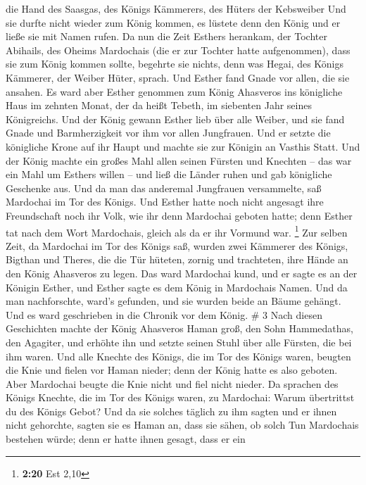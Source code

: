 die Hand des Saasgas, des Königs Kämmerers, des Hüters der Kebsweiber
Und sie durfte nicht wieder zum König kommen, es lüstete denn den König
und er ließe sie mit Namen rufen.  Da nun die Zeit Esthers
herankam, der Tochter Abihails, des Oheims Mardochais (die er zur
Tochter hatte aufgenommen), dass sie zum König kommen sollte, begehrte
sie nichts, denn was Hegai, des Königs Kämmerer, der Weiber Hüter,
sprach. Und Esther fand Gnade vor allen, die sie ansahen. 
Es ward aber Esther genommen zum König Ahasveros ins königliche Haus im
zehnten Monat, der da heißt Tebeth, im siebenten Jahr seines
Königreichs.  Und der König gewann Esther lieb über alle
Weiber, und sie fand Gnade und Barmherzigkeit vor ihm vor allen
Jungfrauen. Und er setzte die königliche Krone auf ihr Haupt und machte
sie zur Königin an Vasthis Statt.  Und der König machte ein
großes Mahl allen seinen Fürsten und Knechten -- das war ein Mahl um
Esthers willen -- und ließ die Länder ruhen und gab königliche Geschenke
aus.  Und da man das anderemal Jungfrauen versammelte, saß
Mardochai im Tor des Königs.  Und Esther hatte noch nicht
angesagt ihre Freundschaft noch ihr Volk, wie ihr denn Mardochai geboten
hatte; denn Esther tat nach dem Wort Mardochais, gleich als da er ihr
Vormund war. \footnote{\textbf{2:20} Est 2,10}  Zur selben
Zeit, da Mardochai im Tor des Königs saß, wurden zwei Kämmerer des
Königs, Bigthan und Theres, die die Tür hüteten, zornig und trachteten,
ihre Hände an den König Ahasveros zu legen.  Das ward
Mardochai kund, und er sagte es an der Königin Esther, und Esther sagte
es dem König in Mardochais Namen.  Und da man nachforschte,
ward's gefunden, und sie wurden beide an Bäume gehängt. Und es ward
geschrieben in die Chronik vor dem König. \# 3  Nach diesen
Geschichten machte der König Ahasveros Haman groß, den Sohn Hammedathas,
den Agagiter, und erhöhte ihn und setzte seinen Stuhl über alle Fürsten,
die bei ihm waren.  Und alle Knechte des Königs, die im Tor
des Königs waren, beugten die Knie und fielen vor Haman nieder; denn der
König hatte es also geboten. Aber Mardochai beugte die Knie nicht und
fiel nicht nieder.  Da sprachen des Königs Knechte, die im
Tor des Königs waren, zu Mardochai: Warum übertrittst du des Königs
Gebot?  Und da sie solches täglich zu ihm sagten und er
ihnen nicht gehorchte, sagten sie es Haman an, dass sie sähen, ob solch
Tun Mardochais bestehen würde; denn er hatte ihnen gesagt, dass er ein
